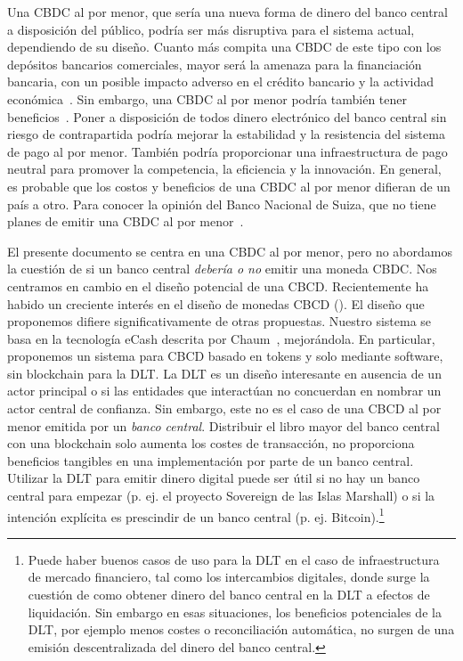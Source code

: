 \documentclass[10pt,spanish]{article}
\begin{document}
Una CBDC al por menor, que sería una nueva forma de dinero del banco
central a disposición del público, podría ser más disruptiva para el
sistema actual, dependiendo de su diseño. Cuanto más compita una CBDC de
este tipo con los depósitos bancarios comerciales, mayor será la amenaza
para la financiación bancaria, con un posible impacto adverso en el
crédito bancario y la actividad económica~\cite[véase][]{Agur}. Sin
embargo, una CBDC al por menor podría también tener
beneficios~\cite[véase][]{Bordo,Berentsen,Bindseil,Niepelt,Riksbank,BoE}.
Poner a disposición de
todos dinero electrónico del banco central sin riesgo de contrapartida
podría mejorar la estabilidad y la resistencia del sistema de pago al
por menor. También podría proporcionar una infraestructura de pago
neutral para promover la competencia, la eficiencia y la innovación. En
general, es probable que los costos y beneficios de una CBDC al por
menor difieran de un país a otro. Para conocer la opinión del Banco
Nacional de Suiza, que no tiene planes de emitir una CBDC al por
menor~\cite[véase][]{Jordan}.

El presente documento se centra en una CBDC al por menor, pero no abordamos la
cuestión de si un banco central \emph{debería o no} emitir una moneda
CBDC. Nos centramos en cambio en el diseño potencial de una
CBCD. Recientemente ha habido un creciente interés en el diseño de monedas
CBCD (\cite[véase p. ej.][]{Allen,BoE}).  El diseño que proponemos difiere
significativamente de otras propuestas.  Nuestro sistema se basa en la
tecnología eCash descrita por Chaum~\cite{Chaum1983,Chaum1990},
mejorándola. En particular, proponemos un sistema para CBCD basado en tokens y
solo mediante software, sin blockchain para la DLT. La DLT es un diseño
interesante en ausencia de un actor principal o si las entidades que
interactúan no concuerdan en nombrar un actor central de confianza. Sin
embargo, este no es el caso de una CBCD al por menor emitida por un
\emph{banco central}. Distribuir el libro mayor del banco central con una
blockchain solo aumenta los costes de transacción, no proporciona beneficios
tangibles en una implementación por parte de un banco central. Utilizar la DLT
para emitir dinero digital puede ser útil si no hay un banco central para
empezar (p. ej.  el proyecto Sovereign de las Islas Marshall) o si la
intención explícita es prescindir de un banco central
(p. ej. Bitcoin).\footnote{Puede haber buenos casos de uso para la DLT en el
caso de infraestructura de mercado financiero, tal como los intercambios
digitales, donde surge la cuestión de como obtener dinero del banco central en
la DLT a efectos de liquidación. Sin embargo en esas situaciones, los
beneficios potenciales de la DLT, por ejemplo menos costes o reconciliación
automática, no surgen de una emisión descentralizada del dinero del banco
central.}
\end{document}
